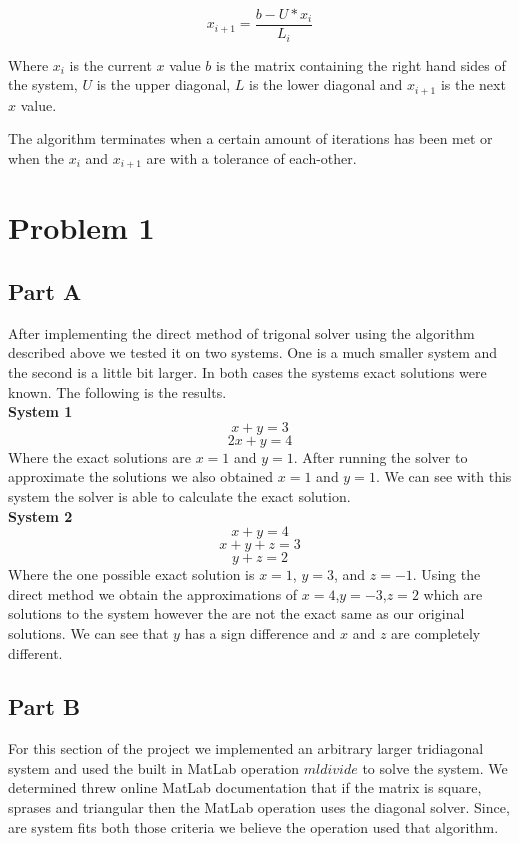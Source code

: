 \documentclass{article}
\begin{document}
$$ x_{i+1} = \frac{b - U*x_i}{L_i}$$ 

Where $x_i$ is the current $x$ value $b$ is the matrix containing the right hand sides of the system, $U$ is the upper diagonal, $L$ is the lower diagonal and $x_{i+1}$ is the next $x$ value. 

The algorithm terminates when a certain amount of iterations has been met or when the $x_i$ and $x_{i+1}$ are with a tolerance of each-other. 

\section*{Problem 1}

\subsection*{Part A}
After implementing the direct method of trigonal solver using the algorithm described above we tested it on two systems. One is a much smaller system and the second is a little bit larger. In both cases the systems exact solutions were known. The following is the results. \\

\textbf{System 1}\\  
$$ x + y = 3 $$  
$$ 2x+y = 4 $$ 
Where the exact solutions are $x=1$ and $y=1$. After running the solver to approximate the solutions we also obtained $x=1$ and $y=1$. We can see with this system the solver is able to calculate the exact solution.  \\

\textbf{System 2}\\
$$ x + y = 4$$ 
$$ x+y+z=3$$ 
$$y+z=2$$
Where the one possible exact solution is $x=1$, $y=3$, and $z=-1$. Using the direct method we obtain the approximations of 
 $x=4$,$y=-3$,$z=2$ which are solutions to the system however the are not the exact same as our original solutions. We can see that $y$ has a sign difference and $x$ and $z$ are completely different. 

\subsection*{Part B}
For this section of the project we implemented an arbitrary larger tridiagonal system and used the built in MatLab operation $mldivide$ to solve the system. We determined threw online MatLab documentation that if the matrix is square, sprases and triangular then the MatLab operation uses the diagonal solver. Since, are system fits both those criteria we believe the operation used that algorithm.  
\end{document}
